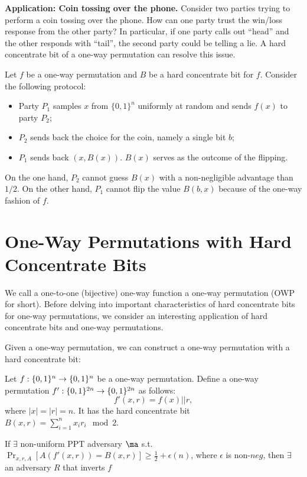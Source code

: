 \bigskip
\noindent\textbf{Application: Coin tossing over the phone.}
Consider two parties trying to perform a coin tossing over the phone.  How can one party trust the win/loss response from the other party?  In particular, if one party calls out ``head'' and the other responds with ``tail'', the second party could be telling a lie.
A hard concentrate bit of a one-way permutation can resolve this issue.

Let $f$ be a one-way permutation and $B$ be a hard concentrate bit for $f$. Consider the following protocol:
\begin{itemize}
\item[-] Party $P_1$ samples $x$ from $\{0,1\}^n$ uniformly at random and sends $f(x)$ to party $P_2$;
\item[-] $P_2$ sends back the choice for the coin, namely a single bit $b$;
\item[-] $P_1$ sends back $(x, B(x))$.  $B(x)$ serves as the outcome of the flipping.
\end{itemize}
On the one hand, $P_2$ cannot guess $B(x)$ with a non-negligible advantage than $1/2$.
On the other hand, $P_1$ cannot flip the value $B(b,x)$  because of the one-way fashion of $f$. 

\section{One-Way Permutations with Hard Concentrate Bits}
We call a one-to-one (bijective) one-way function a one-way permutation (OWP for short).
Before delving into important characteristics of hard concentrate bits for one-way permutations, we consider an interesting application of hard concentrate bits and one-way permutations.





\bigskip
Given a one-way permutation, we can construct a one-way permutation with a hard concentrate bit:
\begin{theorem}
Let  $f:\{0,1\}^{n} \rightarrow \{0,1\}^{n}$ be a one-way permutation.
Define a one-way permutation $f':\{0,1\}^{2n} \rightarrow \{0,1\}^{2n}$ as follows:
$$f'(x,r) = f(x) || r,$$
where $|x| = |r| =n$. It has the hard concentrate bit $B(x, r) = \sum_{i=1}^n x_i r_i\mod 2$.
\end{theorem}
\proof
{}
If $\exists$ non-uniform PPT adversary $\ma$ s.t. $\Pr_{x,r,A}[A(f'(x,r)) = B(x,r)] \ge \frac{1}{2} + \epsilon(n)$, where $\epsilon$ is non-$neg$, then $\exists$ an adversary $R$ that inverts $f$

